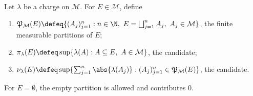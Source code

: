 \begin{definition} \label{def:charges-and-variation-measures} \\
Let $\lambda$ be a charge on $\mathcal{M}$. For $E\in\mathcal{M}$, define
\begin{enumerate}[label=(\roman*)]
\setlength{\itemsep}{0pt}
\item $\mathfrak{P}_{\mathcal{M}}(E)\defeq\{(A_j)_{j=1}^{n}:n\in\N,\ E=\bigsqcup_{j=1}^{n}A_j,\ A_j\in\mathcal{M}\}$, the finite measurable partitions of $E$;
\item $\pi_\lambda(E)\defeq\sup\{\lambda(A):A\subseteq E,\ A\in\mathcal{M}\}$, the  candidate;
\item $\nu_\lambda(E)\defeq\sup\{\sum_{j=1}^{n}\abs{\lambda(A_j)}:(A_j)_{j=1}^{n}\in\mathfrak{P}_{\mathcal{M}}(E)\}$, the  candidate.
\end{enumerate}
For $E=\emptyset$, the empty partition is allowed and contributes $0$.
\end{definition}

